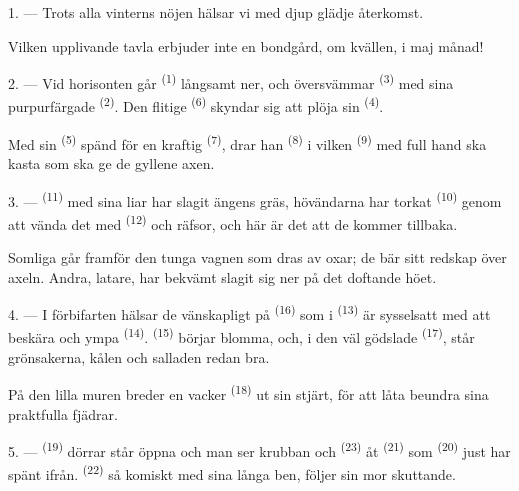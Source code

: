 \VUsaut{4.0mm}

1. --- Trots alla vinterns nöjen hälsar vi med djup glädje  återkomst.

Vilken upplivande tavla erbjuder inte en bondgård, om kvällen, i maj månad!

2. --- Vid horisonten går  \textsuperscript{(1)} långsamt ner, och översvämmar
 \textsuperscript{(3)} med sina purpurfärgade
 \textsuperscript{(2)}. Den flitige 
\textsuperscript{(6)} skyndar sig att plöja sin  \textsuperscript{(4)}.

Med sin  \textsuperscript{(5)} spänd för en kraftig 
\textsuperscript{(7)}, drar han  \textsuperscript{(8)} i vilken
 \textsuperscript{(9)} med full hand ska kasta
 som ska ge de gyllene axen.

3. ---  \textsuperscript{(11)} med sina liar har slagit ängens gräs,
hövändarna har torkat  \textsuperscript{(10)} genom att vända det med
 \textsuperscript{(12)} och räfsor, och här är det att de kommer tillbaka.

Somliga går framför den tunga vagnen som dras av oxar; de bär sitt redskap över axeln. Andra,
latare, har bekvämt slagit sig ner på det doftande höet.

4. --- I förbifarten hälsar de vänskapligt på 
\textsuperscript{(16)} som i  \textsuperscript{(13)} är sysselsatt med
att beskära  och ympa  \textsuperscript{(14)}.
 \textsuperscript{(15)} börjar blomma, och, i den väl gödslade
 \textsuperscript{(17)}, står grönsakerna, kålen och salladen redan
bra.

På den lilla muren breder en vacker  \textsuperscript{(18)} ut sin stjärt, för
att låta beundra sina praktfulla fjädrar.

\VUsaut{3.0mm}

5. ---  \textsuperscript{(19)} dörrar står öppna och man ser krubban och
 \textsuperscript{(23)} åt  \textsuperscript{(21)} som
 \textsuperscript{(20)} just har spänt ifrån. 
\textsuperscript{(22)} så komiskt med sina långa ben, följer sin mor skuttande.

